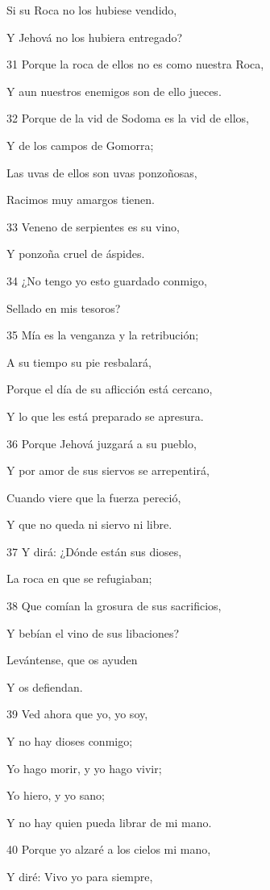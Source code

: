 \par Si su Roca no los hubiese vendido,
\par Y Jehová no los hubiera entregado? 
\par 31 Porque la roca de ellos no es como nuestra Roca,
\par Y aun nuestros enemigos son de ello jueces.
\par 32 Porque de la vid de Sodoma es la vid de ellos,
\par Y de los campos de Gomorra;
\par Las uvas de ellos son uvas ponzoñosas,
\par Racimos muy amargos tienen.
\par 33 Veneno de serpientes es su vino,
\par Y ponzoña cruel de áspides.
\par 34 ¿No tengo yo esto guardado conmigo,
\par Sellado en mis tesoros?
\par 35 Mía es la venganza y la retribución;
\par A su tiempo su pie resbalará,
\par Porque el día de su aflicción está cercano,
\par Y lo que les está preparado se apresura.
\par 36 Porque Jehová juzgará a su pueblo,
\par Y por amor de sus siervos se arrepentirá, 
\par Cuando viere que la fuerza pereció,
\par Y que no queda ni siervo ni libre.
\par 37 Y dirá: ¿Dónde están sus dioses,
\par La roca en que se refugiaban;
\par 38 Que comían la grosura de sus sacrificios,
\par Y bebían el vino de sus libaciones?
\par Levántense, que os ayuden
\par Y os defiendan.
\par 39 Ved ahora que yo, yo soy,
\par Y no hay dioses conmigo;
\par Yo hago morir, y yo hago vivir;
\par Yo hiero, y yo sano;
\par Y no hay quien pueda librar de mi mano.
\par 40 Porque yo alzaré a los cielos mi mano,
\par Y diré: Vivo yo para siempre,
